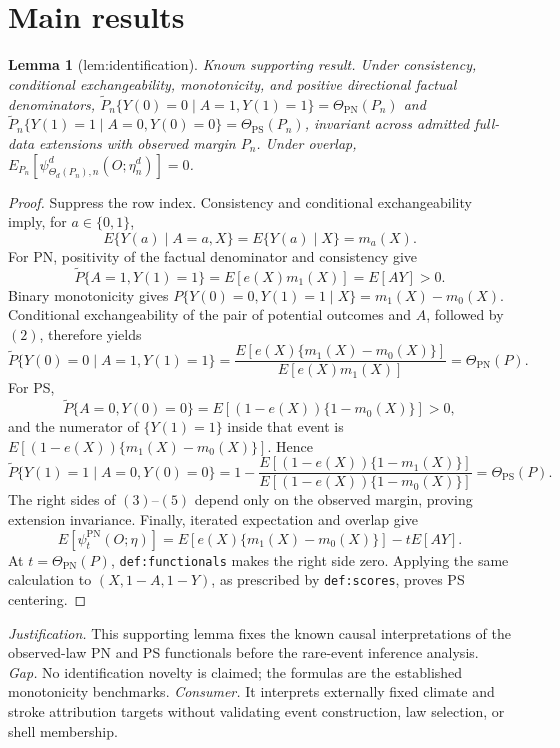 \documentclass{article}
\newtheorem{lemma}{Lemma}
\begin{document}
\section{Main results}

\begin{lemma}[lem:identification]\label{lem:identification}
Known supporting result. Under consistency, conditional exchangeability, monotonicity, and positive directional factual denominators, \(\widetilde P_n\{Y(0)=0\mid A=1,Y(1)=1\}=\Theta_{\mathrm{PN}}(P_n)\) and \(\widetilde P_n\{Y(1)=1\mid A=0,Y(0)=0\}=\Theta_{\mathrm{PS}}(P_n)\), invariant across admitted full-data extensions with observed margin \(P_n\). Under overlap, \(E_{P_n}[\psi^d_{\Theta_d(P_n),n}(O;\eta_n^d)]=0\).
\end{lemma}
\begin{proof}
Suppress the row index. Consistency and conditional exchangeability imply, for \(a\in\{0,1\}\),
\[E\{Y(a)\mid A=a,X\}=E\{Y(a)\mid X\}=m_a(X).\tag{1}\]
For PN, positivity of the factual denominator and consistency give
\[\widetilde P\{A=1,Y(1)=1\}=E[e(X)m_1(X)]=E[AY]>0.\tag{2}\]
Binary monotonicity gives \(P\{Y(0)=0,Y(1)=1\mid X\}=m_1(X)-m_0(X)\). Conditional exchangeability of the pair of potential outcomes and \(A\), followed by \((2)\), therefore yields
\[\widetilde P\{Y(0)=0\mid A=1,Y(1)=1\}=\frac{E[e(X)\{m_1(X)-m_0(X)\}]}{E[e(X)m_1(X)]}=\Theta_{\mathrm{PN}}(P).\tag{3}\]
For PS,
\[\widetilde P\{A=0,Y(0)=0\}=E[(1-e(X))\{1-m_0(X)\}]>0,\tag{4}\]
and the numerator of \(\{Y(1)=1\}\) inside that event is \(E[(1-e(X))\{m_1(X)-m_0(X)\}]\). Hence
\[\widetilde P\{Y(1)=1\mid A=0,Y(0)=0\}=1-\frac{E[(1-e(X))\{1-m_1(X)\}]}{E[(1-e(X))\{1-m_0(X)\}]}=\Theta_{\mathrm{PS}}(P).\tag{5}\]
The right sides of \((3)\)--\((5)\) depend only on the observed margin, proving extension invariance. Finally, iterated expectation and overlap give
\[E[\psi_t^{\mathrm{PN}}(O;\eta)]=E[e(X)\{m_1(X)-m_0(X)\}]-tE[AY].\tag{6}\]
At \(t=\Theta_{\mathrm{PN}}(P)\), \texttt{def:functionals} makes the right side zero. Applying the same calculation to \((X,1-A,1-Y)\), as prescribed by \texttt{def:scores}, proves PS centering.
\end{proof}
\par\smallskip\noindent \textit{Justification.} This supporting lemma fixes the known causal interpretations of the observed-law PN and PS functionals before the rare-event inference analysis. \textit{Gap.} No identification novelty is claimed; the formulas are the established monotonicity benchmarks. \textit{Consumer.} It interprets externally fixed climate and stroke attribution targets without validating event construction, law selection, or shell membership.
\end{document}
